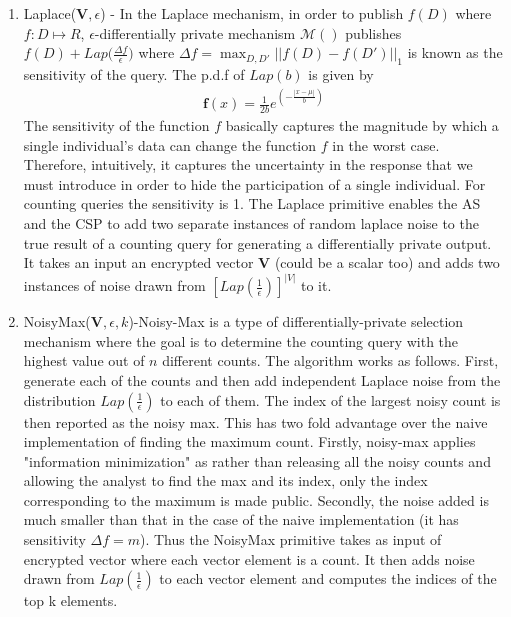 \begin{enumerate}
	\item \textsf{Laplace}($\mathbf{V},\epsilon$) - In the Laplace mechanism, in order
to publish $f(D)$ where $f : D \mapsto R$, $\epsilon$-differentially private mechanism $\mathcal{M()}$ 
publishes $f(D) + Lap\Big(\frac{\Delta f}{\epsilon}\Big)$  
where $\Delta f = \max_{D,D'}||f(D)-f(D')||_1$ is known as the sensitivity of the query. The p.d.f of $Lap(b)$ is given by\begin{gather}\mathbf{f}(x)={\frac  {1}{2b}}e^{ \left(-{\frac  {|x-\mu |}{b}}\right)}\end{gather} The sensitivity of the function $f$ basically captures the magnitude by which a single individual's data can change the function $f$ in the worst case. Therefore, intuitively, it captures the uncertainty in the response that we must introduce in order to hide the participation of a single individual. For counting queries the sensitivity is 1. The \textsf{Laplace} primitive enables the \textsf{AS} and the \textsf{CSP} to add two separate instances of random laplace noise to the true result of a counting query for generating a differentially private output. It takes an input an encrypted vector $\mathbf{V}$ (could be a scalar too) and adds two instances of noise drawn from $[Lap(\frac{1}{\epsilon})]^{|V|}$ to it.

	\item \textsf{NoisyMax}($\mathbf{V},\epsilon, k$)-Noisy-Max is a type of differentially-private selection mechanism where the goal is to determine the counting query with the highest value out of $n$ different counts.  
	The algorithm works as follows. First, generate each of the counts and then add independent Laplace noise from the distribution $Lap(\frac{1}{\epsilon})$ to each of them. The index of the largest noisy count is then reported as the noisy max.
	This has two fold advantage over the naive implementation of finding the maximum count.
Firstly, noisy-max applies "information minimization" as rather than releasing all the noisy counts
and allowing the analyst to find the max and its index, only the
index corresponding to the maximum is made public.
Secondly, the noise added is much smaller than that in the case of the naive implementation (it has sensitivity $\Delta f=m$). Thus the \textsf{NoisyMax} primitive takes as input of encrypted vector where each vector element is a count. It then adds noise drawn from $Lap(\frac{1}{\epsilon})$ to each vector element and computes the indices of the top k elements.
\end{enumerate}
